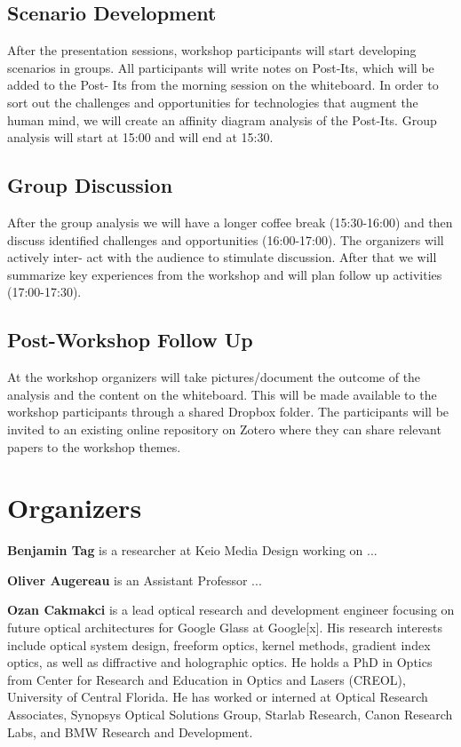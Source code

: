 \documentclass{sigchi-ext}
\begin{document}
\subsection{Scenario Development}
After the presentation sessions, workshop participants will start developing scenarios in groups. All participants will write notes on Post-Its, which will be added to the Post- Its from the morning session on the whiteboard. In order to sort out the challenges and opportunities for technologies that augment the human mind, we will create an affinity diagram analysis of the Post-Its. Group analysis will start at 15:00 and will end at 15:30.

\subsection{Group Discussion}
After the group analysis we will have a longer coffee break (15:30-16:00) and then discuss identified challenges and opportunities (16:00-17:00). The organizers will actively inter- act with the audience to stimulate discussion. After that we will summarize key experiences from the workshop and will plan follow up activities (17:00-17:30).

\subsection{Post-Workshop Follow Up}
At the workshop organizers will take pictures/document the outcome of the analysis and the content on the whiteboard. This will be made available to the workshop participants through a shared Dropbox folder. The participants will be invited to an existing online repository on Zotero where they can share relevant papers to the workshop themes.

\section{Organizers}

{\bf Benjamin Tag} is a researcher at Keio Media Design working on ...

{\bf Oliver Augereau} is an Assistant Professor  ...

{\bf Ozan Cakmakci} is a lead optical research and development engineer focusing on future optical architectures for Google Glass at Google[x]. His research interests include optical system design, freeform optics, kernel methods, gradient index optics, as well as diffractive and holographic optics. He holds a PhD in Optics from Center for Research and Education in Optics and Lasers (CREOL), University of Central Florida. He has worked or interned at Optical Research Associates, Synopsys Optical Solutions Group, Starlab Research, Canon Research Labs, and BMW Research and Development.
\end{document}
